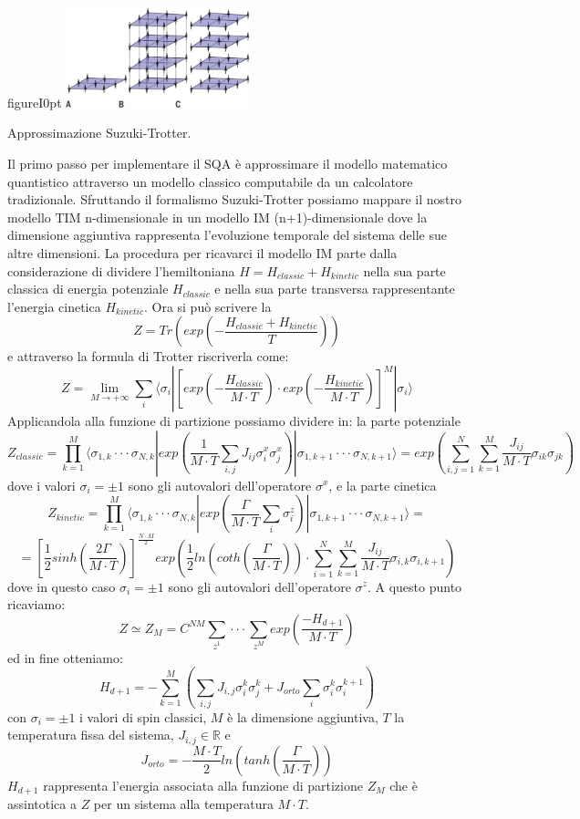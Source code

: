 \begin{wrapfloat}{figure}{I}{0pt}
\includegraphics[width=0.4\textwidth]{Immagini/suzuki.jpg}
\caption{Approssimazione Suzuki-Trotter.}
\label{figura:suzuki}
\end{wrapfloat}
\cite{QA, PIMC}Il primo passo per implementare il SQA è approssimare il modello matematico quantistico attraverso un modello classico computabile da un calcolatore tradizionale. Sfruttando il formalismo Suzuki-Trotter possiamo mappare il nostro modello TIM n-dimensionale in un modello IM (n+1)-dimensionale dove la dimensione aggiuntiva rappresenta l'evoluzione temporale del sistema delle sue altre dimensioni. La procedura per ricavarci il modello IM parte dalla considerazione di dividere l'hemiltoniana $H = H_{classic} + H_{kinetic}$ nella sua parte classica di energia potenziale $H_{classic}$ e nella sua parte transversa rappresentante l'energia cinetica $H_{kinetic}$. Ora si può scrivere la 
$$Z = Tr (exp(-\frac{H_{classic} + H_{kinetic}}{T}))$$ e attraverso la formula di Trotter riscriverla come:
$$Z= \lim_{M \to +\infty} \sum_i \langle\sigma_i|[exp(-\frac{H_{classic}}{M \cdot T}) \cdot exp(-\frac{H_{kinetic}}{M \cdot T})]^M| \sigma_i\rangle$$
Applicandola alla funzione di partizione possiamo dividere in: la parte potenziale
$$Z_{classic} = \prod^M_{k = 1}\langle\sigma_{1,k}\cdot\cdot\cdot\sigma_{N,k}|exp(\frac{1}{M \cdot T} \sum_{i,j} J_{ij}\sigma^x_i\sigma^x_j)|\sigma_{1,k+1}\cdot\cdot\cdot\sigma_{N,k+1}\rangle = exp(\sum_{i,j=1}^N\sum_{k=1}^M \frac{J_{ij}}{M \cdot T}\sigma_{ik}\sigma_{jk})$$
dove i valori $\sigma_i = \pm 1$ sono gli autovalori dell'operatore $\sigma^x$, e la parte cinetica
$$Z_{kinetic} = \prod^M_{k = 1}\langle\sigma_{1,k}\cdot\cdot\cdot\sigma_{N,k}|exp(\frac{\Gamma}{M \cdot T} \sum_{i}\sigma^z_i)|\sigma_{1,k+1}\cdot\cdot\cdot\sigma_{N,k+1}\rangle =$$
$$= [\frac{1}{2} sinh ( \frac{2\Gamma}{M \cdot T} )]^{\frac{N \cdot M}{2}} exp( \frac{1}{2} ln(coth(\frac{\Gamma}{M \cdot T}))\cdot\sum_{i=1}^N\sum_{k=1}^M \frac{J_{ij}}{M \cdot T}\sigma_{i,k}\sigma_{i,k+1})$$
dove in questo caso $\sigma_i = \pm 1$ sono gli autovalori dell'operatore $\sigma^z$.
A questo punto ricaviamo:
$$ Z \simeq Z_M = C^{NM} \sum_{z^1}\cdot\cdot\cdot\sum_{z^M} exp(\frac{-H_{d+1}}{M\cdot T})$$
ed in fine otteniamo:
$$H_{d+1} = - \sum^M_{k = 1}(\sum_{i,j} J_{i,j} \sigma^k_i \sigma^k_j + J_{orto} \sum_i \sigma^k_i \sigma^{k+1}_i)$$
con  $\sigma_i = \pm 1$ i valori di spin classici, $M$ è la dimensione aggiuntiva, $T$ la temperatura fissa del sistema, $J_{i,j} \in \mathbb{R}$ e
$$J_{orto} = - \frac{M\cdot T}{2} ln(tanh(\frac{\Gamma}{M \cdot T}))$$
$H_{d+1}$ rappresenta l'energia associata alla funzione di partizione $Z_M$ che è assintotica a $Z$ per un sistema alla temperatura $M \cdot T$.

